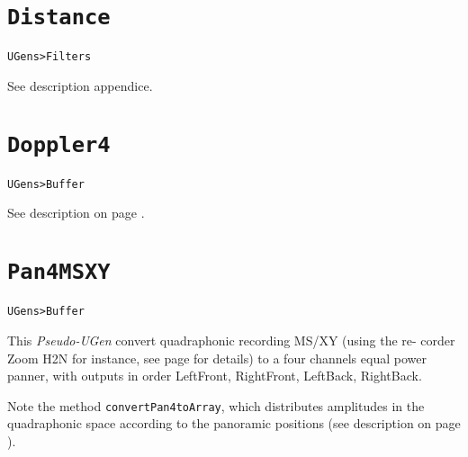 \section{\texttt{Distance}}
\label{ugdist}

\texttt{UGens>Filters}

\bigskip

See description appendice. 


\section{\texttt{Doppler4}}
\label{ugdop}

\texttt{UGens>Buffer}

\bigskip

See description on page \pageref{dop}.


\section{\texttt{Pan4MSXY}}
\label{msxy}

\texttt{UGens>Buffer}

\bigskip

This  \textit{Pseudo-UGen} convert quadraphonic recording MS/XY (using the re- corder Zoom H2N for instance, see page \pageref{mp:msxy} for details) to a four channels equal power panner, with outputs in order LeftFront, RightFront, LeftBack, RightBack.

Note the method \texttt{convertPan4toArray}, which distributes amplitudes in the quadraphonic space according to the panoramic positions (see description on page \pageref{pandist}).

\bigskip


